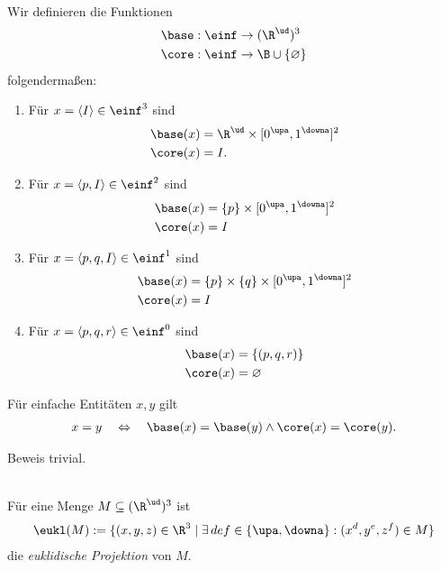 \begin{dfn}\ \\
    Wir definieren die Funktionen 
    \begin{align*}
        \base &: \einf \to (\R^\ud)^3\\ 
        \core &: \einf \to \B \cup \{\varnothing\}
    \end{align*}
    folgendermaßen:
    \begin{enumerate}
        \item Für $x = \langle I \rangle \in \einf^3$ sind
            \begin{align*}
                \base(x) &= \R^\ud \times [0^\upa, 1^\downa]^2\\
                \core(x) &= I.
            \end{align*}
        \item Für $x = \langle p, I \rangle \in \einf^2$ sind
            \begin{align*}
                \base(x) &= \{p\} \times [0^\upa, 1^\downa]^2\\
                \core(x) &= I
            \end{align*}
        \item Für $x = \langle p,q,I \rangle \in \einf^1$ sind
            \begin{align*}
                \base(x) &= \{p\} \times \{q\} \times [0^\upa, 1^\downa]^2\\
                \core(x) &= I
            \end{align*}
        \item Für $x = \langle p,q,r \rangle \in \einf^0$ sind
            \begin{align*}
                \base(x) &= \{(p,q,r)\}\\
                \core(x) &= \varnothing
            \end{align*}
    \end{enumerate}
\end{dfn}


\begin{satz}\label{satz:base-intv-ident}
    Für einfache Entitäten $x,y$ gilt
    \begin{align*}
        x = y \quad \Leftrightarrow \quad \base(x) = \base(y) \land \core(x) = \core(y).
    \end{align*}
\end{satz}
Beweis trivial.


\begin{dfn}\ \\
    Für eine Menge $M \subseteq (\R^\ud)^3$ ist
    \begin{align*}
        \eukl(M) := \{(x,y,z) \in \R^3 \mid \exists\, def \in \{\upa, \downa\}: (x^d, y^e, z^f) \in M\}
    \end{align*}
    die \emph{euklidische Projektion} von $M$.
\end{dfn}


